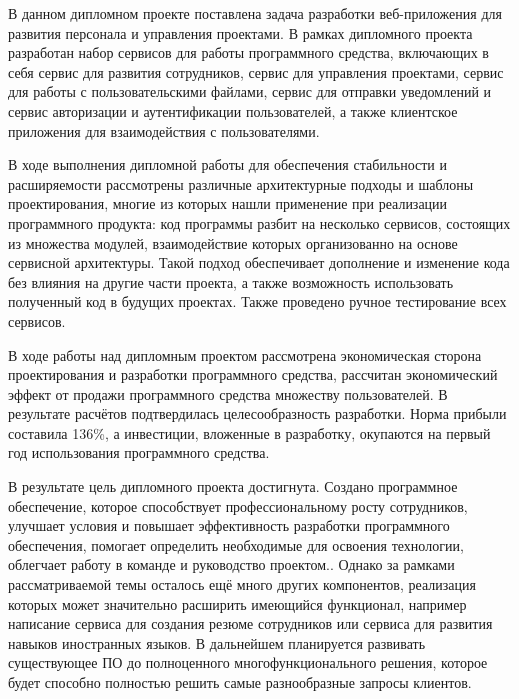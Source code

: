 
В данном дипломном проекте поставлена задача разработки веб-при\-ложения для развития персонала и управления проектами. В рамках дипломного проекта разработан набор сервисов для работы программного средства, включающих в себя сервис для развития сотрудников, сервис для управления проектами, сервис для работы с пользовательскими файлами, сервис для отправки уведомлений и сервис авторизации и аутентификации пользователей, а также клиентское приложения для взаимодействия с пользователями.

В ходе выполнения дипломной работы для обеспечения стабильности и расширяемости рассмотрены различные архитектурные подходы и шаблоны проектирования, многие из которых нашли применение при реализации программного продукта: код программы разбит на несколько сервисов, состоящих из множества модулей, взаимодействие которых организованно на основе сервисной архитектуры. Такой подход обеспечивает дополнение и изменение кода без влияния на другие части проекта, а также возможность использовать полученный код в будущих проектах. Также проведено ручное тестирование всех сервисов.

В ходе работы над дипломным проектом рассмотрена экономическая сторона проектирования и разработки программного средства, рассчитан экономический эффект от продажи программного средства множеству пользователей. В результате расчётов подтвердилась целесообразность разработки. Норма прибыли составила 136\%, а инвестиции, вложенные в разработку, окупаются на первый год использования программного средства.

В результате цель дипломного проекта достигнута. Создано программное обеспечение, которое способствует профессиональному росту сотрудников, улучшает условия и повышает эффективность разработки программного обеспечения, помогает определить необходимые для освоения технологии, облегчает работу в команде и руководство проектом.. Однако за рамками рассматриваемой темы осталось ещё много других компонентов, реализация которых может значительно расширить имеющийся функционал, например написание сервиса для создания резюме сотрудников или сервиса для развития навыков иностранных языков. В дальнейшем планируется развивать существующее ПО до полноценного многофункционального решения, которое будет способно полностью решить самые разнообразные запросы клиентов.
